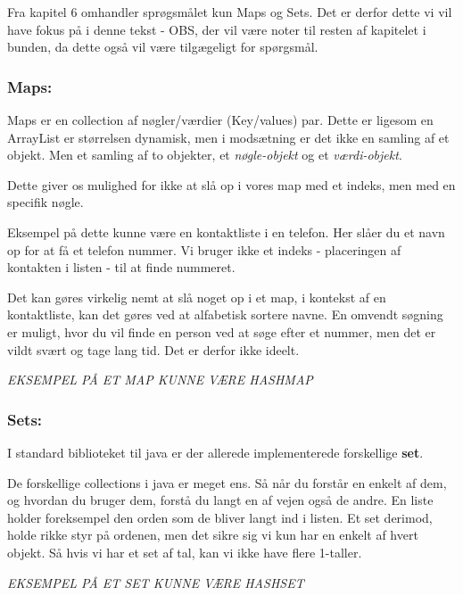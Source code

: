 \documentclass{article}
\begin{document}
Fra kapitel 6 omhandler sprøgsmålet kun Maps og Sets. Det er derfor dette vi vil have fokus på i denne tekst - OBS, der vil være noter til resten af kapitelet i bunden, da dette også vil være tilgægeligt for spørgsmål.

\subsubsection*{Maps:}
Maps er en collection af nøgler/værdier (Key/values) par. Dette er ligesom en ArrayList er størrelsen dynamisk, men i modsætning er det ikke en samling af et objekt. Men et samling af to objekter, et \textit{nøgle-objekt} og et \textit{værdi-objekt}. 

Dette giver os mulighed for ikke at slå op i vores map med et indeks, men med en specifik nøgle.

Eksempel på dette kunne være en kontaktliste i en telefon. Her slåer du et navn op for at få et telefon nummer. Vi bruger ikke et indeks - placeringen af kontakten i listen - til at finde nummeret.

Det kan gøres virkelig nemt at slå noget op i et map, i kontekst af en kontaktliste, kan det gøres ved at alfabetisk sortere navne. En omvendt søgning er muligt, hvor du vil finde en person ved at søge efter et nummer, men det er vildt svært og tage lang tid. Det er derfor ikke ideelt.

\begin{center}
    \textit{EKSEMPEL PÅ ET MAP KUNNE VÆRE HASHMAP}
\end{center}

\subsubsection*{Sets:}
I standard biblioteket til java er der allerede implementerede forskellige \textbf{set}.

De forskellige collections i java er meget ens. Så når du forstår en enkelt af dem, og hvordan du bruger dem, forstå du langt en af vejen også de andre. En liste holder foreksempel den orden som de bliver langt ind i listen. Et set derimod, holde rikke styr på ordenen, men det sikre sig vi kun har en enkelt af hvert objekt. Så hvis vi har et set af tal, kan vi ikke have flere 1-taller.

\begin{center}
    \textit{EKSEMPEL PÅ ET SET KUNNE VÆRE HASHSET}
\end{center}
\end{document}
